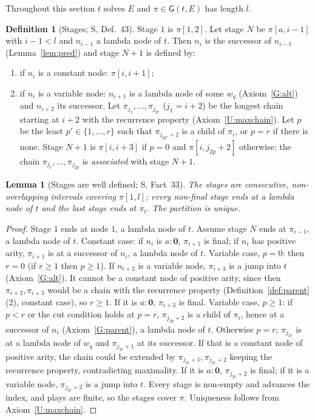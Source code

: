 \documentclass[11pt]{article}
\newcommand{\Ground}{\mathbf{0}}
\newcommand{\Gm}{\mathsf{G}}
\newcommand{\iv}[2]{\pi[#1,#2]}
\theoremstyle{plain}
\newtheorem{lemma}[theorem]{Lemma}
\theoremstyle{definition}
\newtheorem{definition}[theorem]{Definition}
\theoremstyle{remark}
\begin{document}
Throughout this section $t$ solves $E$ and $\pi\in\Gm(t,E)$ has length
$l$.

\begin{definition}[Stages; S, Def.~43]\label{def:partition}
Stage $1$ is $\iv12$.  Let stage $N$ be $\iv{a}{i-1}$ with $i-1<l$ and
$n_{i-1}$ a lambda node of $t$.  Then $n_i$ is the successor of
$n_{i-1}$ (Lemma~\ref{lem:pred}) and stage $N+1$ is defined by:
\begin{enumerate}
\item if $n_i$ is a constant node: $\iv i{i+1}$;
\item if $n_i$ is a variable node: $n_{i+1}$ is a lambda node of some
  $w_q$ (Axiom~\ref{G:alt}) and $n_{i+2}$ its successor.  Let
  $\pi_{j_1},\dots,\pi_{j_{2r}}$ ($j_1=i+2$) be the longest chain starting
  at $i+2$ with the recurrence property (Axiom~\ref{U:maxchain}).  Let
  $p$ be the least $p'\in\{1,\dots,r\}$ such that $\pi_{j_{2p'}+2}$ is a
  child of $\pi_i$, or $p=r$ if there is none.  Stage $N+1$ is
  $\iv i{i+3}$ if $p=0$ and $\iv i{j_{2p}+2}$ otherwise; the chain
  $\pi_{j_1},\dots,\pi_{j_{2p}}$ is \emph{associated} with stage $N+1$.
\end{enumerate}
\end{definition}

\begin{lemma}[Stages are well defined; S, Fact~33]\label{lem:partition}
The stages are consecutive, non-overlapping intervals covering $\iv1l$;
every non-final stage ends at a lambda node of $t$ and the last stage
ends at $\pi_l$.  The partition is unique.
\end{lemma}
\begin{proof}
Stage $1$ ends at node $1$, a lambda node of $t$.  Assume stage $N$ ends
at $\pi_{i-1}$, a lambda node of $t$.  Constant case: if $n_i$ is
$a:\Ground$, $\pi_{i+1}$ is final; if $n_i$ has positive arity,
$\pi_{i+1}$ is at a successor of $n_i$, a lambda node of $t$.  Variable
case, $p=0$: then $r=0$ (if $r\ge1$ then $p\ge1$).  If $n_{i+2}$ is a
variable node, $\pi_{i+3}$ is a jump into $t$ (Axiom~\ref{G:alt}).  It
cannot be a constant node of positive arity, since then
$\pi_{i+2},\pi_{i+3}$ would be a chain with the recurrence property
(Definition~\ref{def:parent}(2), constant case), so $r\ge1$.  If it is
$a:\Ground$, $\pi_{i+3}$ is final.  Variable case, $p\ge1$: if $p<r$ or
the cut condition holds at $p=r$, $\pi_{j_{2p}+2}$ is a child of $\pi_i$,
hence at a successor of $n_i$ (Axiom~\ref{G:parent}), a lambda node of
$t$.  Otherwise $p=r$; $\pi_{j_{2r}}$ is at a lambda node of $w_q$ and
$\pi_{j_{2r}+1}$ at its successor.  If that is a constant node of
positive arity, the chain could be extended by
$\pi_{j_{2r}+1},\pi_{j_{2r}+2}$ keeping the recurrence property,
contradicting maximality.  If it is $a:\Ground$, $\pi_{j_{2r}+2}$ is
final; if it is a variable node, $\pi_{j_{2r}+2}$ is a jump into $t$.
Every stage is non-empty and advances the index, and plays are finite,
so the stages cover $\pi$.  Uniqueness follows from
Axiom~\ref{U:maxchain}.
\end{proof}
\end{document}
